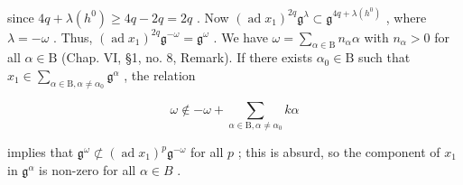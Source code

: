 since \(4q + \lambda(h^0) \geq 4q - 2q = 2q\) . Now \((\operatorname{ad} x_1)^{2q} \mathfrak{g}^\lambda \subset \mathfrak{g}^{4q + \lambda(h^0)}\) , where \(\lambda = -\omega\) . Thus, \((\operatorname{ad} x_1)^{2q} \mathfrak{g}^{-\omega} = \mathfrak{g}^\omega\) . We have \(\omega = \sum_{\alpha \in \mathrm{B}} n_\alpha \alpha\) with \(n_\alpha > 0\) for all \(\alpha \in \mathrm{B}\) (Chap. VI, §1, no. 8, Remark). If there exists \(\alpha_0 \in \mathrm{B}\) such that \(x_1 \in \sum_{\alpha \in \mathrm{B}, \alpha \neq \alpha_0} \mathfrak{g}^\alpha\) , the relation

\[
\omega \notin - \omega + \sum_ {\alpha \in \mathrm{B}, \alpha \neq \alpha_ {0}} k \alpha
\]

implies that \(\mathfrak{g}^{\omega} \not\subset (\operatorname{ad} x_1)^p \mathfrak{g}^{-\omega}\) for all \(p\) ; this is absurd, so the component of \(x_1\) in \(\mathfrak{g}^{\alpha}\) is non-zero for all \(\alpha \in B\) .

